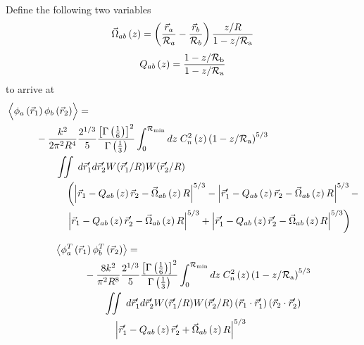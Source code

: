 Define the following two variables
\begin{equation}\label{Omega}
\vec{\Omega}_{ab}\left(z\right) = 
\left(\frac{\vec{r}_{a}}{\mathcal{R}_{a}} - \frac{\vec{r}_{b}}{\mathcal{R}_{b}} \right) \frac{z/R}{1-z/\mathcal{R}_{\rm a}}
\end{equation}
\begin{equation}\label{Q}
Q_{ab}\left(z\right) =  
\frac{1 - z/\mathcal{R}_{\rm b}}{1-z/\mathcal{R}_{\rm a}}
\end{equation}
to arrive at
\begin{equation}\label{prphase_n6}
\begin{aligned}
&\left\langle \vphantom{\hat{\phi}_{a}} \phi_{a}\left(\vec{r}_{1}\right) \phi_{b}\left(\vec{r}_{2}\right)\right\rangle = \\
&\quad\quad\quad
-\frac{k^{2}}{2\pi^{2}R^{4}} 
\frac{2^{1/3}}{5}\frac{\left[\Gamma\left(\frac{1}{6}\right)\right]^{2}}{\Gamma\left(\frac{1}{3}\right)} 
\int_{0}^{\mathcal{R}_{\rm min}} dz\;C_{n}^{2}\left(z\right) 
\left(1 - z/\mathcal{R}_{\rm a}\right)^{5/3}\\
&\quad\quad\quad\quad\quad
\iint \; d\vec{r}^{\prime}_{1}d\vec{r}^{\prime}_{2}  
W(\vec{r}^{\prime}_{1}/R) W(\vec{r}^{\prime}_{2}/R) \\
&\quad\quad\quad\quad\quad\quad
\left(\left\vert \vec{r}_{1}  - Q_{ab}\left(z\right)\vec{r}_{2} - \vec{\Omega}_{ab}\left(z\right)R\right\vert^{5/3} -
\left\vert \vec{r}^{\prime}_{1}  - Q_{ab}\left(z\right)\vec{r}_{2} - \vec{\Omega}_{ab}\left(z\right)R\right\vert^{5/3} -
\right. \\
& \quad\quad\quad\quad\quad\quad
\left.
\left\vert \vec{r}_{1}  - Q_{ab}\left(z\right)\vec{r}^{\prime}_{2} - \vec{\Omega}_{ab}\left(z\right)R\right\vert^{5/3} + 
\left\vert \vec{r}^{\prime}_{1}  - Q_{ab}\left(z\right)\vec{r}^{\prime}_{2} - \vec{\Omega}_{ab}\left(z\right)R\right\vert^{5/3}\right)
\end{aligned}
\end{equation}

\begin{equation}\label{tphase_n6}
\begin{aligned}
&\left\langle \phi^{T}_{a}\left(\vec{r}_{1}\right) \phi^{T}_{b}\left(\vec{r}_{2}\right)\right\rangle = \\
&\quad\quad\quad
-\frac{8k^{2}}{\pi^{2}R^{8}} 
\frac{2^{1/3}}{5}\frac{\left[\Gamma\left(\frac{1}{6}\right)\right]^{2}}{\Gamma\left(\frac{1}{3}\right)} 
\int_{0}^{\mathcal{R}_{\rm min}} dz\;C_{n}^{2}\left(z\right) 
\left(1 - z/\mathcal{R}_{\rm a}\right)^{5/3}\\
&\quad\quad\quad\quad\quad
\iint \; d\vec{r}^{\prime}_{1}d\vec{r}^{\prime}_{2} W(\vec{r}^{\prime}_{1}/R) W(\vec{r}^{\prime}_{2}/R)
\left(\vec{r}_{1} \cdot \vec{r}^{\prime}_{1}\right)
\left(\vec{r}_{2} \cdot \vec{r}^{\prime}_{2}\right)
\\
&\quad\quad\quad\quad\quad\quad
\left\vert \vec{r}^{\prime}_{1} - Q_{ab}\left(z\right) \vec{r}^{\prime}_{2} + \vec{\Omega}_{ab}\left(z\right) R\right\vert^{5/3}
\end{aligned}
\end{equation}

